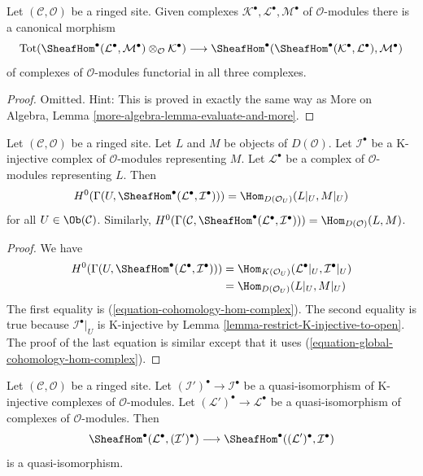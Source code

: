 \begin{lemma}
\label{lemma-evaluate-and-more}
Let $(\mathcal{C}, \mathcal{O})$ be a ringed site. Given complexes
$\mathcal{K}^\bullet, \mathcal{L}^\bullet, \mathcal{M}^\bullet$
of $\mathcal{O}$-modules there is a canonical morphism
$$
\text{Tot}(\SheafHom^\bullet(\mathcal{L}^\bullet,
\mathcal{M}^\bullet) \otimes_\mathcal{O} \mathcal{K}^\bullet)
\longrightarrow
\SheafHom^\bullet(\SheafHom^\bullet(\mathcal{K}^\bullet,
\mathcal{L}^\bullet), \mathcal{M}^\bullet)
$$
of complexes of $\mathcal{O}$-modules functorial in all three complexes.
\end{lemma}

\begin{proof}
Omitted. Hint: This is proved in exactly the same way as
More on Algebra, Lemma \ref{more-algebra-lemma-evaluate-and-more}.
\end{proof}

\begin{lemma}
\label{lemma-RHom-into-K-injective}
Let $(\mathcal{C}, \mathcal{O})$ be a ringed site. Let $L$ and $M$
be objects of $D(\mathcal{O})$. Let $\mathcal{I}^\bullet$
be a K-injective complex of $\mathcal{O}$-modules representing $M$. Let
$\mathcal{L}^\bullet$ be a complex of $\mathcal{O}$-modules
representing $L$.
Then
$$
H^0(\Gamma(U, \SheafHom^\bullet(\mathcal{L}^\bullet, \mathcal{I}^\bullet))) =
\Hom_{D(\mathcal{O}_U)}(L|_U, M|_U)
$$
for all $U \in \Ob(\mathcal{C})$. Similarly,
$H^0(\Gamma(\mathcal{C},
\SheafHom^\bullet(\mathcal{L}^\bullet, \mathcal{I}^\bullet))) =
\Hom_{D(\mathcal{O})}(L, M)$.
\end{lemma}

\begin{proof}
We have
\begin{align*}
H^0(\Gamma(U, \SheafHom^\bullet(\mathcal{L}^\bullet, \mathcal{I}^\bullet)))
& =
\Hom_{K(\mathcal{O}_U)}(\mathcal{L}^\bullet|_U, \mathcal{I}^\bullet|_U) \\
& =
\Hom_{D(\mathcal{O}_U)}(L|_U, M|_U)
\end{align*}
The first equality is (\ref{equation-cohomology-hom-complex}).
The second equality is true because $\mathcal{I}^\bullet|_U$
is K-injective by Lemma \ref{lemma-restrict-K-injective-to-open}.
The proof of the last equation is similar except that it uses
(\ref{equation-global-cohomology-hom-complex}).
\end{proof}

\begin{lemma}
\label{lemma-RHom-well-defined}
Let $(\mathcal{C}, \mathcal{O})$ be a ringed site. Let
$(\mathcal{I}')^\bullet \to \mathcal{I}^\bullet$
be a quasi-isomorphism of K-injective complexes of $\mathcal{O}$-modules.
Let $(\mathcal{L}')^\bullet \to \mathcal{L}^\bullet$
be a quasi-isomorphism of complexes of $\mathcal{O}$-modules.
Then
$$
\SheafHom^\bullet(\mathcal{L}^\bullet, (\mathcal{I}')^\bullet)
\longrightarrow
\SheafHom^\bullet((\mathcal{L}')^\bullet, \mathcal{I}^\bullet)
$$
is a quasi-isomorphism.
\end{lemma}

